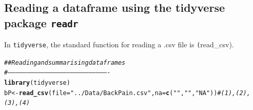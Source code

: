 \documentclass[titlepage]{book}
\makeatletter
\newcommand{\hlstr}[1]{\textcolor[rgb]{0.192,0.494,0.8}{#1}}%
\newcommand{\hlcom}[1]{\textcolor[rgb]{0.678,0.584,0.686}{\textit{#1}}}%
\newcommand{\hlstd}[1]{\textcolor[rgb]{0.345,0.345,0.345}{#1}}%
\newcommand{\hlkwb}[1]{\textcolor[rgb]{0.69,0.353,0.396}{#1}}%
\newcommand{\hlkwc}[1]{\textcolor[rgb]{0.333,0.667,0.333}{#1}}%
\newcommand{\hlkwd}[1]{\textcolor[rgb]{0.737,0.353,0.396}{\textbf{#1}}}%
\newenvironment{kframe}{%
 \def\at@end@of@kframe{}%
 \ifinner\ifhmode%
  \def\at@end@of@kframe{\end{minipage}}%
  \begin{minipage}{\columnwidth}%
 \fi\fi%
 \def\FrameCommand##1{\hskip\@totalleftmargin \hskip-\fboxsep
 \colorbox{shadecolor}{##1}\hskip-\fboxsep
     \hskip-\linewidth \hskip-\@totalleftmargin \hskip\columnwidth}%
 \MakeFramed {\advance\hsize-\width
   \@totalleftmargin\z@ \linewidth\hsize
   \@setminipage}}%
 {\par\unskip\endMakeFramed%
 \at@end@of@kframe}
\newenvironment{knitrout}{}{} %
\makeatother
\begin{document}
\subsection{Reading a dataframe using the tidyverse package \texttt{readr}}

In \texttt{tidyverse}, the standard function for reading a .csv file is \texttt(read\_csv).

\begin{knitrout}
\color{fgcolor}\begin{kframe}
\begin{alltt}
  \hlcom{##Reading and summarising data frames}
  \hlcom{#----------------------------------------------------------------------------------}
\hlkwd{library}\hlstd{(tidyverse)}
\hlstd{bP}        \hlkwb{<-} \hlkwd{read_csv}\hlstd{(}\hlkwc{file}\hlstd{=}\hlstr{"../Data/BackPain.csv"}\hlstd{,} \hlkwc{na} \hlstd{=} \hlkwd{c}\hlstd{(}\hlstr{""}\hlstd{,}\hlstr{" "}\hlstd{,}\hlstr{"NA"}\hlstd{))}      \hlcom{# (1), (2), (3), (4)}
\end{alltt}


{\ttfamily\noindent\itshape\color{messagecolor}{\#\# Parsed with column specification:\\\#\# cols(\\\#\#\ \  .default = col\_character(),\\\#\#\ \  age = col\_double(),\\\#\#\ \  bmi = col\_double(),\\\#\#\ \  waistc = col\_double(),\\\#\#\ \  comorb = col\_double(),\\\#\#\ \  disability = col\_double(),\\\#\#\ \  height = col\_double()\\\#\# )}}


\end{kframe}
\end{knitrout}
\end{document}
